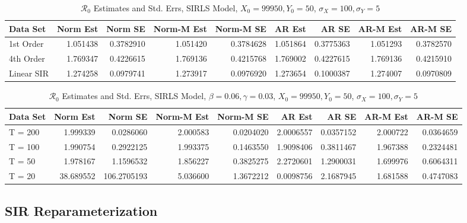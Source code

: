 \message{ !name(draft_v13.tex)}\documentclass[12pt]{article}
\newcommand{\rr}{\ensuremath{\mathcal{R}_0}}
\begin{document}
\begin{table}[H]
	
	\caption{\label{tab:}$\rr$ Estimates and Std. Errs, SIRLS Model,
		$X_0 = 99950, Y_0 = 50$, $\sigma_X = 100, \sigma_Y = 5$}
	\centering
	\begin{footnotesize}
		\begin{tabular}[t]{l|r|r|r|r|r|r|r|r}
			\hline
			Data Set & Norm Est & Norm SE & Norm-M Est & Norm-M SE & AR Est & AR SE & AR-M Est & AR-M SE\\
			\hline
			1st Order & 1.051438 & 0.3782910 & 1.051420 & 0.3784628 & 1.051864 & 0.3775363 & 1.051293 & 0.3782570\\
			\hline
			4th Order & 1.769347 & 0.4226615 & 1.769136 & 0.4215768 & 1.769002 & 0.4227615 & 1.769136 & 0.4215910\\
			\hline
			Linear SIR & 1.274258 & 0.0979741 & 1.273917 & 0.0976920 & 1.273654 & 0.1000387 & 1.274007 & 0.0970809\\
			\hline
		\end{tabular}
	\end{footnotesize}
\end{table}

\begin{table}[H]
	
	\caption{\label{tab:}$\rr$ Estimates and Std. Errs, SIRLS Model,
		$\beta = 0.06, \gamma = 0.03$, $X_0 = 99950, Y_0 = 50$, $\sigma_X = 100, \sigma_Y = 5$}
	\centering
	\begin{tabular}[t]{l|r|r|r|r|r|r|r|r}
		\hline
		Data Set & Norm Est & Norm SE & Norm-M Est & Norm-M SE & AR Est & AR SE & AR-M Est & AR-M SE\\
		\hline
		T = 200 & 1.999339 & 0.0286060 & 2.000583 & 0.0204020 & 2.0006557 & 0.0357152 & 2.000722 & 0.0364659\\
		\hline
		T = 100 & 1.990754 & 0.2922125 & 1.993375 & 0.1463550 & 1.9098406 & 0.3811467 & 1.967388 & 0.2324481\\
		\hline
		T = 50 & 1.978167 & 1.1596532 & 1.856227 & 0.3825275 & 2.2720601 & 1.2900031 & 1.699976 & 0.6064311\\
		\hline
		T = 20 & 38.689552 & 106.2705193 & 5.036600 & 1.3672212 & 0.0098756 & 2.1687945 & 1.681588 & 0.4747083\\
		\hline
	\end{tabular}
\end{table}

\subsection{SIR Reparameterization}
\end{document}
